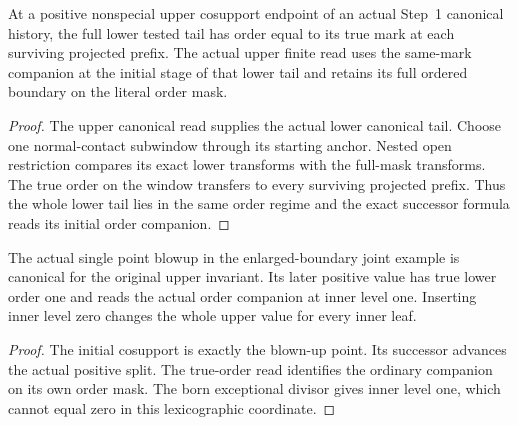 \begin{theorem}
\label{hir:g1-later-actual-full-order-run}
\leanok
At a positive nonspecial upper cosupport endpoint of an
actual Step~1 canonical history, the full lower tested tail
has order equal to its true mark at each surviving projected
prefix. The actual upper finite read uses the same-mark
companion at the initial stage of that lower tail and retains
its full ordered boundary on the literal order mask.
\end{theorem}
\begin{proof}
The upper canonical read supplies the actual lower canonical
tail. Choose one normal-contact subwindow through its starting
anchor. Nested open restriction compares its exact lower
transforms with the full-mask transforms. The true order on
the window transfers to every surviving projected prefix.
Thus the whole lower tail lies in the same order regime and
the exact successor formula reads its initial order companion.
\end{proof}

\begin{theorem}
\label{hir:g1-joint-example-canonical-born-level}
\leanok
The actual single point blowup in the enlarged-boundary joint
example is canonical for the original upper invariant. Its later
positive value has true lower order one and reads the actual
order companion at inner level one. Inserting inner level zero
changes the whole upper value for every inner leaf.
\end{theorem}
\begin{proof}
The initial cosupport is exactly the blown-up point. Its
successor advances the actual positive split. The true-order
read identifies the ordinary companion on its own order mask.
The born exceptional divisor gives inner level one, which
cannot equal zero in this lexicographic coordinate.
\end{proof}

